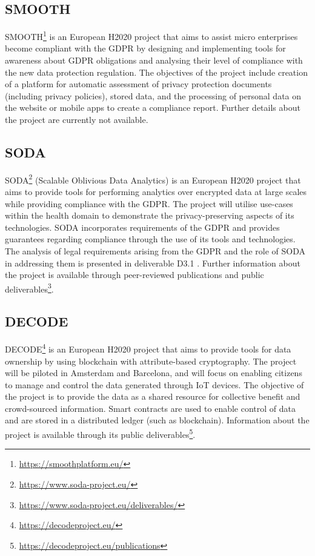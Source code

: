 \subsection{SMOOTH}
SMOOTH\footnote{\url{https://smoothplatform.eu/}} is an European H2020 project that aims to assist micro enterprises become compliant with the GDPR by designing and implementing tools for awareness about GDPR obligations and analysing their level of compliance with the new data protection regulation.
The objectives of the project include creation of a platform for automatic assessment of privacy protection documents (including privacy policies), stored data, and the processing of personal data on the website or mobile apps to create a compliance report. Further details about the project are currently not available.

\subsection{SODA}
SODA\footnote{\url{https://www.soda-project.eu/}} (Scalable Oblivious Data Analytics) is an European H2020 project that aims to provide tools for performing analytics over encrypted data at large scales while providing compliance with the GDPR. The project will utilise use-cases within the health domain to demonstrate the privacy-preserving aspects of its technologies. SODA incorporates requirements of the GDPR and provides guarantees regarding compliance through the use of its tools and technologies. The analysis of legal requirements arising from the GDPR and the role of SODA in addressing them is presented in deliverable D3.1 \cite{spindler_d3.1_2017}. Further information about the project is available through peer-reviewed publications and public deliverables\footnote{\url{https://www.soda-project.eu/deliverables/}}.

\subsection{DECODE}
DECODE\footnote{\url{https://decodeproject.eu/}} is an European H2020 project that aims to provide tools for data ownership by using blockchain with attribute-based cryptography. The project will be piloted in Amsterdam and Barcelona, and will focus on enabling citizens to manage and control the data generated through IoT devices. The objective of the project is to provide the data as a shared resource for collective benefit and crowd-sourced information. Smart contracts are used to enable control of data and are stored in a distributed ledger (such as blockchain). Information about the project is available through its public deliverables\footnote{\url{https://decodeproject.eu/publications}}.

